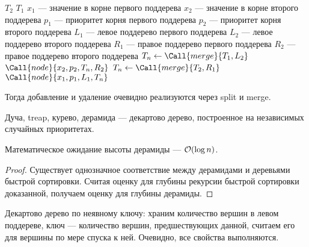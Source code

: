 \noindent
\begin{minipage}{\textwidth}
    \begin{algorithmic}
                \Return $T_2$
            \EndIf
                \Return $T_1$
            \EndIf
            \State $x_1$ --- значение в корне первого поддерева
            \State $x_2$ --- значение в корне второго поддерева
            \State $p_1$ --- приоритет корня первого поддерева
            \State $p_2$ --- приоритет корня второго поддерева
            \State $L_1$ --- левое поддерево первого поддерева
            \State $L_2$ --- левое поддерево второго поддерева
            \State $R_1$ --- правое поддерево первого поддерева
            \State $R_2$ --- правое поддерево второго поддерева
                \State $T_n \gets \Call{merge}{T_1, L_2}$
                \State \Return $\Call{node}{x_2, p_2, T_n, R_2}$
            \Else
                \State $T_n \gets \Call{merge}{T_2, R_1}$
                \State \Return $\Call{node}{x_1, p_1, L_1, T_n}$
            \EndIf
        \EndFunction
    \end{algorithmic}
\end{minipage}

Тогда добавление и удаление очевидно реализуются
через split и merge.

\begin{definition}
    Дуча, treap, курево, дерамида --- декартово дерево,
    построенное на независимых случайных приоритетах.
\end{definition}

\begin{theorem}
    Математическое ожидание высоты дерамиды --- $\mathcal{O}(\log n)$.
\end{theorem}
\begin{proof}
    Существует однозначное соответствие между дерамидами
    и деревьями быстрой сортировки.
    Считая оценку для глубины рекурсии быстрой сортировки доказанной,
    получаем оценку для глубины дерамиды.
\end{proof}

Декартово дерево по неявному ключу:
храним количество вершин в левом поддереве,
ключ --- количество вершин, предшествующих данной,
считаем его для вершины по мере спуска к ней.
Очевидно, все свойства выполняются.
